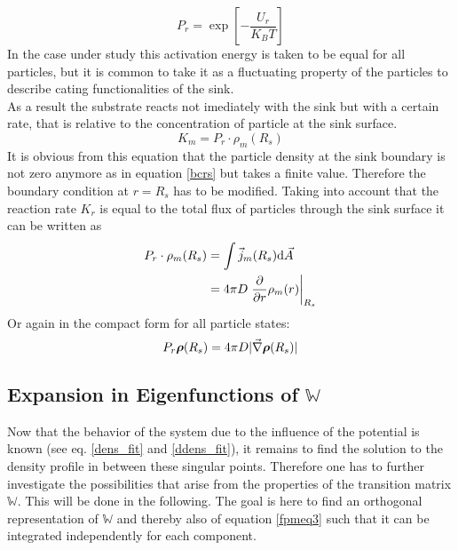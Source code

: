 \begin{equation}
    P_r = \exp\left[- \frac{U_r}{K_B T} \right]
    \label{reaction_arrhenius_factor}
\end{equation}
In the case under study this activation energy is taken to be equal for all particles, but it is common to take it as a fluctuating property of the particles to describe cating functionalities of the sink. \cite{Szabo1982} \\
As a result the substrate reacts not imediately with the sink but with a certain rate, that is relative to the concentration of particle at the sink surface.
\begin{equation}
    K_m = P_r \cdot \rho_m(R_s)
    \label{sink_reaction_rate}
\end{equation}
It is obvious from this equation that the particle density at the sink boundary is not zero anymore as in equation \eqref{bcrs} but takes a finite value. Therefore the boundary condition at $r=R_s$ has to be modified.
Taking into account that the reaction rate $K_r$ is equal to the total flux of particles through the sink surface it can be written as
\begin{align}
    P_r \cdot \rho_m(R_s) &= \int \vec{j}_m(R_s) {\rm d} \vec{A} \nonumber \\
    &= 4 \pi D \left.\frac{\partial}{\partial r} \rho_m(r)\right|_{R_s}
    \label{nbcrs}
\end{align}
Or again in the compact form for all particle states:
\begin{equation}
    P_r \boldsymbol{\mathbf{\rho}}(R_s) = 4 \pi D |\vec{\nabla} \boldsymbol{\mathbf{\rho}}(R_s)|
    \label{nbcrsall}
\end{equation}
\subsection{Expansion in Eigenfunctions of $\mathbb{W}$}
\label{Expansion_in_Eigenfunctions}
Now that the behavior of the system due to the influence of the potential is known (see eq. \eqref{dens_fit} and \eqref{ddens_fit}), it remains to find the solution to the density profile in between these singular points. Therefore one has to further investigate the possibilities that arise from the properties of the transition matrix $\mathbb{W}$. This will be done in the following. The goal is here to find an orthogonal representation of $\mathbb{W}$ and thereby also of equation \eqref{fpmeq3} such that it can be integrated independently for each component.\\

